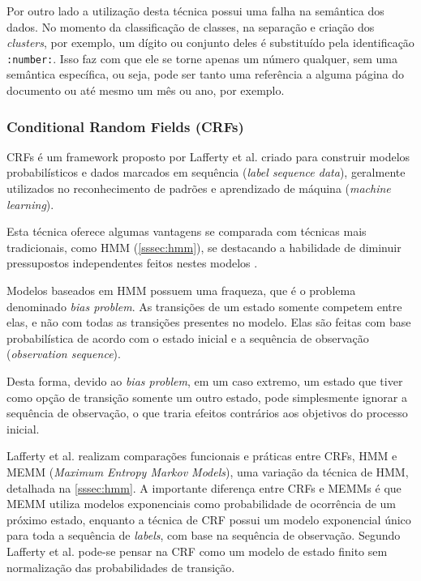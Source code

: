 Por outro lado a utilização desta técnica possui uma falha na semântica dos dados. No momento da classificação de classes, na separação e criação dos \textit{clusters}, por exemplo, um dígito ou conjunto deles é substituído pela identificação \texttt{:number:}. Isso faz com que ele se torne apenas um número qualquer, sem uma semântica específica, ou seja, pode ser tanto uma referência a alguma página do documento ou até mesmo um mês ou ano, por exemplo.


\subsubsection{Conditional Random Fields (CRFs)}
\label{sssec:crf}


CRFs é um framework proposto por Lafferty et al. \cite{Lafferty-CRF} criado para construir modelos probabilísticos e dados marcados em sequência (\textit{label sequence data}), geralmente utilizados no reconhecimento de padrões e aprendizado de máquina (\textit{machine learning}).

Esta técnica oferece algumas vantagens se comparada com técnicas mais tradicionais, como HMM (\autoref{sssec:hmm}), se destacando a habilidade de diminuir pressupostos independentes feitos nestes modelos \cite{Lafferty-CRF}.

Modelos baseados em HMM possuem uma fraqueza, que é o problema denominado \textit{bias problem}. As transições de um estado somente competem entre elas, e não com todas as transições presentes no modelo. Elas são feitas com base probabilística de acordo com o estado inicial e a sequência de observação (\textit{observation sequence}).

Desta forma, devido ao \textit{bias problem}, em um caso extremo, um estado que tiver como opção de transição somente um outro estado, pode simplesmente ignorar a sequência de observação, o que traria efeitos contrários aos objetivos do processo inicial.

Lafferty et al. realizam comparações funcionais e práticas entre CRFs, HMM e MEMM (\textit{Maximum Entropy Markov Models}), uma variação da técnica de HMM, detalhada na \autoref{sssec:hmm}. A importante diferença entre CRFs e MEMMs é que MEMM utiliza modelos exponenciais como probabilidade de ocorrência de um próximo estado, enquanto a técnica de CRF possui um modelo exponencial único para toda a sequência de \textit{labels}, com base na sequência de observação. Segundo Lafferty et al. \cite{Lafferty-CRF} pode-se pensar na CRF como um modelo de estado finito sem normalização das probabilidades de transição.

